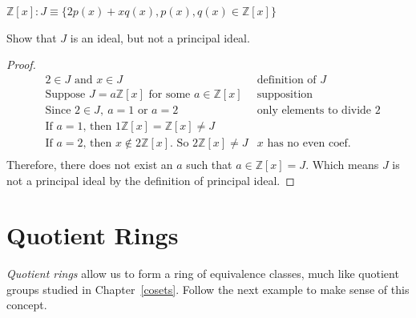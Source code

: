 \begin{example}{}
${\mathbb Z}[x]: J\equiv \{2p(x)+xq(x),p(x),q(x)\in {\mathbb Z}[x]\}$

Show that $J$ is an ideal, but not a principal ideal.\\

\begin{proof}
\begin{align*}
&\text{$2\in J$ and $x\in J$} &\text{definition of $J$}\\
&\text{Suppose $J=a{\mathbb Z}[x]$ for some $a\in {\mathbb Z}[x]$} & \text{supposition}\\
&\text{Since $2\in J,~a=1$ or $a=2$} & \text{only elements to divide 2}\\
&\text{If $a=1$, then $1{\mathbb Z}[x]={\mathbb Z}[x]\neq J$} &\\
&\text{If $a=2$, then $x\notin 2{\mathbb Z}[x]$. So $2{\mathbb Z}[x]\neq J$} & \text{$x$ has no even coef.}\\
\end{align*}
Therefore, there does not exist an $a$ such that $a\in {\mathbb Z}[x]=J$. Which means $J$ is not a principal ideal by the definition of principal ideal.
\end{proof}
\end{example}

\section{Quotient Rings}
\label{sec:Rings:QuotientRings}

\emph{Quotient rings} allow us to form a ring of equivalence classes, much like quotient groups studied in Chapter~\ref{cosets}.  Follow the next example to make sense of this concept.

